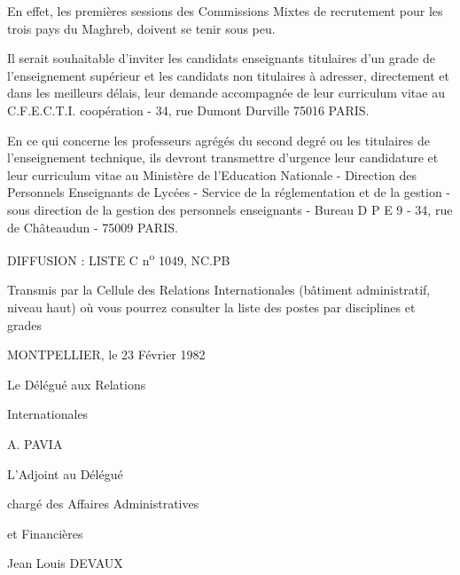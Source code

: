 En effet, les premières sessions des Commissions Mixtes de recrutement pour les trois pays du Maghreb, doivent se tenir sous peu.

Il serait souhaitable d'inviter les candidats enseignants titulaires d'un grade de l'enseignement supérieur et les candidats non titulaires à adresser, directement et dans les meilleurs délais, leur demande accompagnée de leur curriculum vitae au C.F.E.C.T.I.  coopération - 34, rue Dumont Durville 75016 PARIS.

En ce qui concerne les professeurs agrégés du second degré ou les titulaires de l'enseignement technique, ils devront transmettre d'urgence leur candidature et leur curriculum vitae au Ministère de l'Education Nationale - Direction des Personnels Enseignants de Lycées - Service de la réglementation et de la gestion - sous direction de la gestion des personnels enseignants - Bureau D P E 9 - 34, rue de Châteaudun - 75009 PARIS.

DIFFUSION : LISTE C n\textsuperscript{o} 1049, NC.PB

Transmis par la Cellule des Relations Internationales (bâtiment administratif, niveau haut) où vous pourrez consulter la liste des postes par disciplines et grades

MONTPELLIER, le 23 Février 1982

Le Délégué aux Relations\par Internationales

A. PAVIA

L'Adjoint au Délégué\par chargé des Affaires Administratives\par et Financières

Jean Louis DEVAUX
